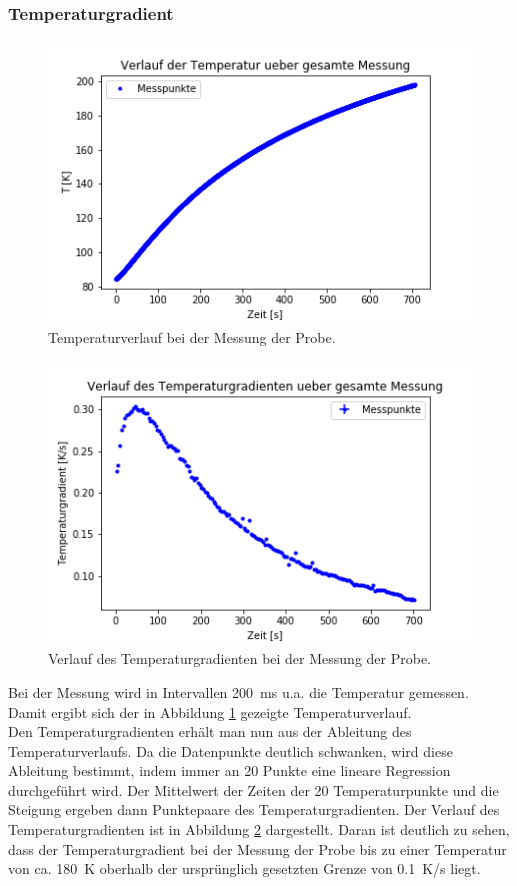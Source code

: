 \documentclass[12pt,a4paper]{article}
\begin{document}
\subsubsection{Temperaturgradient}

\begin{figure}
\centering
\includegraphics[scale=1]{Bilder/Haupt_Probe/Temperatur_Verlauf.png}
\caption[test]{Temperaturverlauf bei der Messung der Probe.}
\label{fig:TemperaturverlaufProbe}
\end{figure}

\begin{figure}
\centering
\includegraphics[scale=1]{Bilder/Haupt_Probe/Temperaturgradient_Verlauf.png}
\caption[test]{Verlauf des Temperaturgradienten bei der Messung der Probe.}
\label{fig:TemperaturgradientverlaufProbe}
\end{figure}

Bei der Messung wird in Intervallen \SI{200}{ms} u.a. die Temperatur gemessen. Damit ergibt sich der in Abbildung \ref{fig:TemperaturverlaufProbe} gezeigte Temperaturverlauf. \\
Den Temperaturgradienten erhält man nun aus der Ableitung des Temperaturverlaufs. Da die Datenpunkte deutlich schwanken, wird diese Ableitung bestimmt, indem immer an 20 Punkte eine lineare Regression durchgeführt wird. Der Mittelwert der Zeiten der 20 Temperaturpunkte und die Steigung ergeben dann Punktepaare des Temperaturgradienten. Der Verlauf des Temperaturgradienten ist in Abbildung \ref{fig:TemperaturgradientverlaufProbe} dargestellt. Daran ist deutlich zu sehen, dass der Temperaturgradient bei der Messung der Probe bis zu einer Temperatur von ca. \SI{180}{K} oberhalb der ursprünglich gesetzten Grenze von \SI{0,1}{K/s} liegt.
\end{document}
